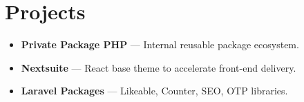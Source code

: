 \section*{Projects}
\begin{itemize}
  \item \textbf{Private Package PHP} --- Internal reusable package ecosystem.
  \item \textbf{Nextsuite} --- React base theme to accelerate front-end delivery.
  \item \textbf{Laravel Packages} --- Likeable, Counter, SEO, OTP libraries.
\end{itemize}
